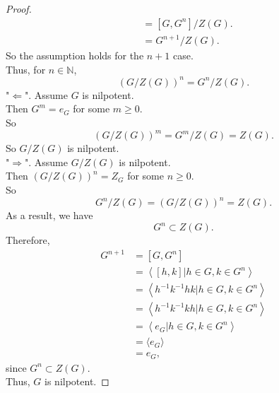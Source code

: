 \documentclass{amsart}
\newcommand{\bbn}{\mathbb{N}}
\theoremstyle{plain}
\theoremstyle{definition}
\begin{document}
\begin{proof}
\begin{align*}
  	  			 &=[G,G^n]/Z(G).\\
  	  			 &=G^{n+1}/Z(G).
	\end{align*}
	So the assumption holds for the $n+1$ case.\\
	Thus, for $n \in \bbn$,
	\[({G/Z(G)})^n = G^n/Z(G).\]
	"$\Leftarrow$". Assume $G$ is nilpotent.\\
	Then $G^m = e_G$ for some $m \geq 0$.\\
	So
	\[({G/Z(G)})^m = G^m/Z(G) = Z(G).\]
	So $G/Z(G)$ is nilpotent.\\
	"$\Rightarrow$". Assume $G/Z(G)$ is nilpotent.\\
	Then $(G/Z(G))^n = Z_G$ for some $n \geq 0$.\\
	So
	\[G^n/Z(G) = ({G/Z(G)})^n = Z(G).\]
	As a result, we have 
	\[G^n \subset Z(G).\]
	Therefore,
	\begin{align*}
	 	G^{n+1} &= [G,G^n] \\
				&=\left\langle [h, k]|h \in G, k \in G^n \right\rangle \\
				&=\left\langle h^{-1}k^{-1}hk|h \in G, k \in G^n \right\rangle \\
				&=\left\langle h^{-1}k^{-1}kh|h \in G, k \in G^n \right\rangle \\
				&=\left\langle e_G|h \in G, k \in G^n \right\rangle \\
	  			&=\langle e_G \rangle \\
	  			&= e_G,
  	\end{align*}
  	since $G^n \subset Z(G)$.\\
	Thus, $G$ is nilpotent.
 \end{proof}
\end{document}
